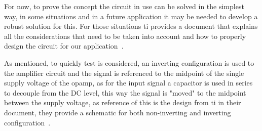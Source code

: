 For now, to prove the concept the circuit in use can be solved in the simplest way, in some situations and in a future application it may be needed to develop a robust solution for this. For those situations \acrshort{ti} provides a document that explains all the considerations that need to be taken into account and how to properly design the circuit for our application~\cite{manciniSingleSupplyOpAmp}.

As mentioned, to quickly test is considered, an inverting configuration is used to the amplifier circuit and the signal is referenced to the midpoint of the single supply voltage of the \acrshort{opamp}, as for the input signal a capacitor is used in series to decouple from the DC level, this way the signal is "moved" to the midpoint between the supply voltage, as reference of this is the design from \acrshort{ti} in their document, they provide a schematic for both non-inverting and inverting configuration~\cite{ACCoupledSingle2015}.

